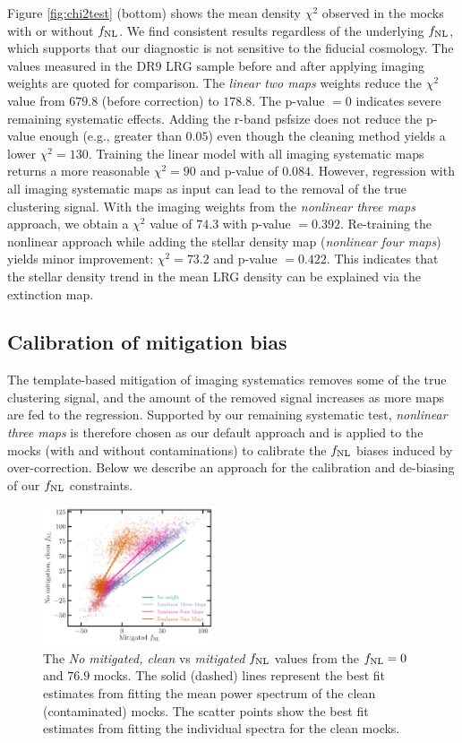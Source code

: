 Figure \ref{fig:chi2test} (bottom) shows the mean density $\chi^{2}$ observed in the mocks with or without $f_{\rm NL}$. We find consistent results regardless of the underlying $f_{\rm NL}$, which supports that our diagnostic is not sensitive to the fiducial cosmology. The values measured in the DR9 LRG sample before and after applying imaging weights are quoted for comparison. The \textit{linear two maps} weights reduce the $\chi^{2}$ value from $679.8$ (before correction) to $178.8$. The p-value $=0$ indicates severe remaining systematic effects. Adding the r-band psfsize does not reduce the p-value enough (e.g., greater than $0.05$) even though the cleaning method yields a lower $\chi^{2}=130$. Training the linear model with all imaging systematic maps returns a more reasonable $\chi^{2}=90$ and p-value of $0.084$. However, regression with all imaging systematic maps as input can lead to the removal of the true clustering signal. With the imaging weights from the \textit{nonlinear three maps} approach, we obtain a $\chi^{2}$ value of $74.3$ with p-value $=0.392$. Re-training the nonlinear approach while adding the stellar density map (\textit{nonlinear four maps}) yields minor improvement: $\chi^{2}=73.2$ and p-value $=0.422$.  This indicates that the stellar density trend in the mean LRG density can be explained via the extinction map.




\subsection{Calibration of mitigation bias}\label{ssec:calibration}


The template-based mitigation of imaging systematics removes some of the true clustering signal, and the amount of the removed signal increases as more maps are fed to the regression. Supported by our remaining systematic test, \textit{nonlinear three maps} is therefore chosen as our default approach and is applied to the mocks (with and without contaminations) to calibrate the $f_{\rm NL}$ biases induced by over-correction. Below we describe an approach for the calibration and de-biasing of our $f_{\rm NL}$ constraints. 

\begin{figure}
\centering
\includegraphics[width=0.45\textwidth]{figures/fnlbias}
\caption{The \textit{No mitigated, clean} vs \textit{mitigated} $f_{\rm NL}$ values from the $f_{\rm NL}=0$ and $76.9$ mocks. The solid (dashed) lines represent the best fit estimates from fitting the mean power spectrum of the clean (contaminated) mocks. The scatter points show the best fit estimates from fitting the individual spectra for the clean mocks.}\label{fig:fnlbias}
\end{figure}



